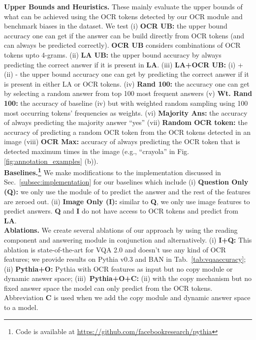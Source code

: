 \documentclass[10pt,twocolumn,letterpaper]{article}
\begin{document}
\noindent\textbf{Upper Bounds and Heuristics.}
These mainly evaluate the upper bounds of what can be achieved using the OCR tokens detected by our OCR module and benchmark biases in the dataset. We test (i) \textbf{OCR UB:} the upper bound accuracy one can get if the answer can be build directly from OCR tokens (and can always be predicted correctly). \textbf{OCR UB} considers combinations of OCR tokens upto 4-grams.
(ii) \textbf{LA UB:} the upper bound accuracy  by always predicting the  correct answer if it is present in \textbf{LA}. 
(iii) \textbf{LA+OCR UB:} (i) + (ii) - the upper bound accuracy one can get by predicting the correct answer if it is present in either LA or OCR tokens.
(iv) \textbf{Rand 100:} the accuracy one can get by selecting a random answer from top 100 most frequent answers (v) \textbf{Wt. Rand 100:} the accuracy of baseline (iv) but with weighted random sampling using 100 most occurring tokens' frequencies as weights. (vi) \textbf{Majority Ans:} the accuracy of always predicting the majority answer ``yes'' (vii) \textbf{Random OCR token:} the accuracy of predicting a random OCR token from the OCR tokens detected in an image (viii) \textbf{OCR Max:} accuracy of always predicting the OCR token that is detected maximum times in the image (e.g., ``crayola'' in Fig. \ref{fig:annotation_examples} (b)). 
\\

\noindent\textbf{Baselines.\footnote{Code is available at \underline{\href{https://github.com/facebookresearch/pythia}{https://github.com/facebookresearch/pythia}}}} We make modifications to the implementation discussed in Sec.~\ref{subsec:implementation} for our  baselines which include (i) \textbf{Question Only (Q):} we only use the  module of \approachNameShort to predict the answer and the rest of the features are zeroed out. (ii) \textbf{Image Only (I):} similar to  \textbf{Q}, we only use image features  to predict answers.  
\textbf{Q} and \textbf{I} do not have access to OCR tokens and predict from \textbf{LA}. 
\\

\noindent\textbf{Ablations.}
We create several ablations of our approach \approachNameShort
by using the reading component and answering module in conjunction and alternatively. (i) \textbf{I+Q:} This ablation is state-of-the-art for VQA 2.0 and doesn't use any kind of OCR features; we provide results on Pythia v0.3 and BAN \cite{kim2018bilinear} in Tab.~\ref{tab:vqaaccuracy}; (ii) \textbf{Pythia+O:} Pythia with OCR features as input but no copy module or dynamic answer space; (iii)~\textbf{Pythia+O+C:} (ii) with the copy mechanism but no fixed answer space \ie the model can only predict from the OCR tokens. Abbreviation \textbf{C} is used when we add the copy module and dynamic answer space to a model.
\end{document}

